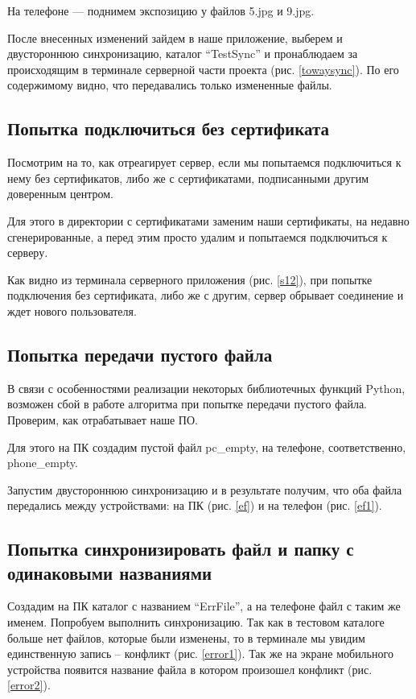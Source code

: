 На телефоне --- поднимем экспозицию у файлов 5.jpg и 9.jpg.

После внесенных изменений зайдем в наше приложение, выберем и двустороннюю синхронизацию,  каталог ``TestSync'' и пронаблюдаем за происходящим в терминале серверной части проекта (рис. \ref{towaysync}). По его содержимому видно, что передавались только измененные файлы.

\newpage
\subsection{Попытка подключиться без сертификата}
Посмотрим на то, как отреагирует сервер, если мы попытаемся подключиться к нему без сертификатов, либо же с сертификатами, подписанными другим доверенным центром.

Для этого в директории с сертификатами заменим наши сертификаты, на недавно сгенерированные, а перед этим просто удалим и попытаемся подключиться к серверу.

Как видно из терминала серверного приложения (рис. \ref{s12}), при попытке подключения без сертификата, либо же с другим, сервер обрывает соединение и ждет нового пользователя.


\subsection{Попытка передачи пустого файла}
В связи с особенностями реализации некоторых библиотечных функций Python, возможен сбой в работе алгоритма при попытке передачи пустого файла. Проверим, как отрабатывает наше ПО.

Для этого на ПК создадим пустой файл pc\_empty, на телефоне, соответственно, phone\_empty.

Запустим двустороннюю синхронизацию и в результате получим, что оба файла передались между устройствами: на ПК (рис. \ref{ef}) и на телефон (рис. \ref{ef1}).



\subsection{Попытка синхронизировать файл и папку с одинаковыми названиями}
Создадим на ПК каталог с названием ``ErrFile'', а на телефоне файл с таким же именем. Попробуем выполнить синхронизацию. Так как в тестовом каталоге больше нет файлов, которые были изменены, то в терминале мы увидим единственную запись -- конфликт (рис. \ref{error1}). Так же на экране мобильного устройства появится название файла в котором произошел конфликт (рис. \ref{error2}).


